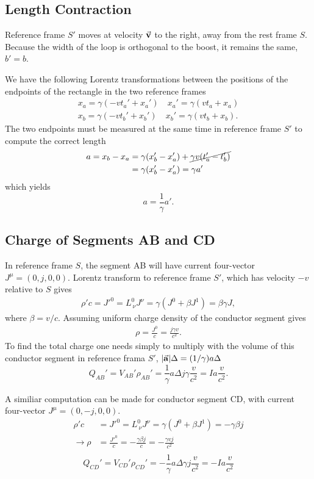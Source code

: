 \documentclass[11pt]{amsart}
\begin{document}
\subsection{Length Contraction}
Reference frame $S'$ moves at velocity $\va{v}$ to the right, away from the rest frame $S$. Because the width of the loop is orthogonal to the boost, it remains the same, $b' = b$. 

We have the following Lorentz transformations between the positions of the endpoints of the rectangle in the two reference frames
\begin{align*}
x_a = \gamma(-vt_a' + x_a') \quad x_a' = \gamma(vt_a + x_a) \\
x_b = \gamma(-vt_b' + x_b') \quad x_b' = \gamma(vt_b + x_b).
\end{align*}
The two endpoints must be measured at the same time in reference frame $S'$ to compute the correct length
\begin{align*}
a =x_b - x_a &= \gamma(x_b'- x_a') + \cancel{\gamma v(t_a' - t_b')} \\
			 &= \gamma(x_b'- x_a') = \gamma a'
\end{align*}
which yields
\begin{equation}
a = \frac{1}{\gamma}a'.
\end{equation}

\subsection{Charge of Segments AB and CD}
In reference frame $S$, the segment AB will have current four-vector $J^\mu = (0, j, 0, 0)$. Lorentz transform to reference frame $S'$, which has velocity $-v$ relative to $S$ gives
\begin{align*}
\rho'c = J'^0 = L^0_{\ \nu}J^\nu = \gamma(J^0 + \beta J^1) = \beta\gamma J,
\end{align*}
where $\beta = v/c$. Assuming uniform charge density of the conductor segment gives
\begin{align*}
\rho = \frac{J^0}{c} = \frac{j\gamma v}{c^2}.
\end{align*}
To find the total charge one needs simply to multiply with the volume of this conductor segment in reference frama $S'$, $\abs{\va{a}}\Delta = (1/\gamma)a\Delta$
\begin{equation}
Q_{AB}' = V_{AB}'\rho_{AB}' = \frac{1}{\gamma}a\Delta j\gamma \frac{v}{c^2} = I a\frac{v}{c^2}.
\end{equation}

A similiar computation can be made for conductor segment CD, with current four-vector $J^\mu = (0, -j, 0, 0)$.
\begin{align*}
\rho'c &= J'^0 = L^0_{\ \nu} J^\nu = \gamma(J^0+ \beta J^1) = -\gamma\beta j \\
\rightarrow \rho &= \frac{J'^0}{c} = -\frac{\gamma\beta j}{c} = -\frac{\gamma v j}{c^2} \\
\end{align*}
\begin{equation}
Q_{CD}' = V_{CD}'\rho_{CD}' = -\frac{1}{\gamma}a\Delta \gamma j\frac{ v}{c^2} = -Ia\frac{v}{c^2}
\end{equation}
\end{document}

